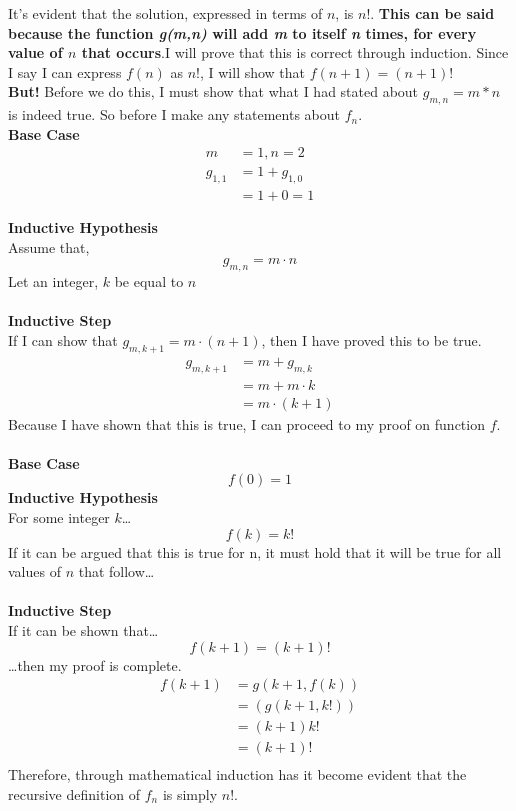 \documentclass[12pt]{article}
\begin{document}
\begin{answer}
It's evident that the solution, expressed in terms of $n$, is $n!$. \textbf{This can be said because the function \textit{g(m,n)} will add \textit{m} to itself \textit{n} times, for every value of $n$ that occurs}.\newline I will prove that this is correct through induction. Since I say I can express $f(n)$ as $n!$, I will show that $f(n+1) = (n+1)!$ \\ 

\textbf{But!} Before we do this, I must show that what I had stated about $g_{m,n} = m*n$ is indeed true. So before I make any statements about $f_{n}$. \\

\textbf{Base Case} 
\begin{align*}
m&=1, n=2 \\
g_{1,1} &= 1 + g_{1,0} \\
        &= 1 + 0 = 1
\end{align*}

\textbf{Inductive Hypothesis} \\
Assume that,
$$ g_{m,n} = m\cdot n $$
Let an integer, $k$ be equal to $n$\\ \\
\textbf{Inductive Step}\\
If I can show that $g_{m,k+1} = m\cdot(n+1)$, then I have proved this to be true. 
\begin{align*}
g_{m,k+1} &= m + g_{m, k} \\
          &= m + m \cdot k \\
          &= m \cdot (k+1)
\end{align*}
Because I have shown that this is true, I can proceed to my proof on function $f$. \\ \\
\textbf{Base Case}
$$f(0) = 1$$
\textbf{Inductive Hypothesis} \\ For some integer $k$\dots $$f(k) = k!$$ If it can be argued that this is true for n, it must hold that it will be true for all values of $n$ that follow\dots \\ \\ \textbf{Inductive Step} \\ If it can be shown that\dots $$f(k+1) = (k+1)!$$ \dots then my proof is complete.
\begin{align*}
f(k+1) 
&= g(k+1,f(k))\\
&= (g(k+1, k!))\\
&= (k+1)k! \\
&= (k+1)! \\
\end{align*}
Therefore, through mathematical induction has it become evident that the recursive definition of $f_{n}$ is simply $n!$.
\end{answer}
\end{document}
